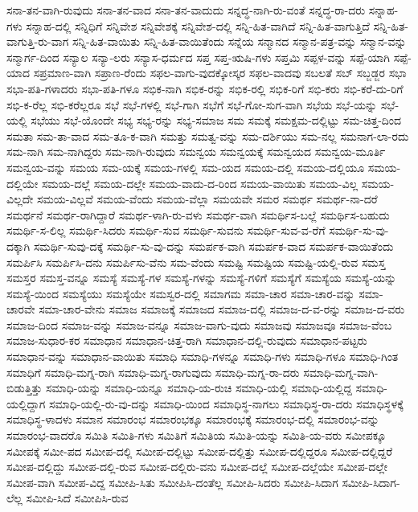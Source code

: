 {ಸನಾ-ತನ-ವಾಗಿ-ರುವುದು
ಸನಾ-ತನ-ವಾದ
ಸನಾ-ತನ-ವಾದುದು
ಸನ್ನದ್ಧ-ನಾಗಿ-ರು-ವಂತೆ
ಸನ್ನದ್ಧ-ರಾ-ದರು
ಸನ್ನಾಹ-ಗಳು
ಸನ್ನಾಹ-ದಲ್ಲಿ
ಸನ್ನಿಧಿಗೆ
ಸನ್ನಿವೇಶ
ಸನ್ನಿವೇಶಕ್ಕೆ
ಸನ್ನಿವೇಶ-ದಲ್ಲಿ
ಸನ್ನಿ-ಹಿತ-ವಾಗಿದೆ
ಸನ್ನಿ-ಹಿತ-ವಾಗುತ್ತಿದೆ
ಸನ್ನಿ-ಹಿತ-ವಾಗುತ್ತಿ-ರು-ವಾಗ
ಸನ್ನಿ-ಹಿತ-ವಾಯಿತು
ಸನ್ನಿ-ಹಿತ-ವಾಯಿತೆಂದು
ಸನ್ನೆಯ
ಸನ್ಮಾನದ
ಸನ್ಮಾನ-ಪತ್ರ-ವನ್ನು
ಸನ್ಮಾನ-ವನ್ನು
ಸನ್ಮಾರ್ಗ-ದಿಂದ
ಸನ್ಯಾಲ
ಸನ್ಯಾ-ಲರು
ಸನ್ಯಾಸ-ಧರ್ಮದ
ಸಪ್ತ
ಸಪ್ತ-ಋಷಿ-ಗಳು
ಸಪ್ತಮಿ
ಸಪ್ಪಳ-ವನ್ನು
ಸಪ್ಪೆ-ಯಾಗಿ
ಸಪ್ಪೆ-ಯಾದ
ಸಪ್ರಮಾಣ-ವಾಗಿ
ಸಪ್ರಾಣ-ರೆಂದು
ಸಫಲ-ವಾಗು-ವುದಕ್ಕೋಸ್ಕರ
ಸಫಲ-ವಾದವು
ಸಬಲತೆ
ಸಬ್
ಸಬ್ಜಡ್ಜರ
ಸಭಾ
ಸಭಾ-ಪತಿ-ಗಳಾದರು
ಸಭಾ-ಪತಿ-ಗಳೂ
ಸಭಿಕ-ನಾಗಿ
ಸಭಿಕ-ರನ್ನು
ಸಭಿಕ-ರಲ್ಲಿ
ಸಭಿಕ-ರಿಗೆ
ಸಭಿ-ಕರು
ಸಭಿ-ಕರೆ-ದು-ರಿಗೆ
ಸಭಿ-ಕ-ರೆಲ್ಲ
ಸಭಿ-ಕರೆಲ್ಲರೂ
ಸಭೆ
ಸಭೆ-ಗಳಲ್ಲಿ
ಸಭೆ-ಗಾಗಿ
ಸಭೆಗೆ
ಸಭೆ-ಗೋ-ಸುಗ-ವಾಗಿ
ಸಭೆಯ
ಸಭೆ-ಯನ್ನು
ಸಭೆ-ಯಲ್ಲಿ
ಸಭೆಯು
ಸಭೆ-ಯೊಂದೇ
ಸಭ್ಯ
ಸಭ್ಯ-ರನ್ನು
ಸಭ್ಯ-ಸಮಾಜ
ಸಮ
ಸಮಕ್ಕೆ
ಸಮಕ್ಷಮ-ದಲ್ಲಿಟ್ಟು
ಸಮ-ಚಿತ್ತ-ದಿಂದ
ಸಮತಾ
ಸಮ-ತಾ-ವಾದ
ಸಮ-ತೂ-ಕ-ವಾಗಿ
ಸಮತ್ತು
ಸಮತ್ವ-ವನ್ನು
ಸಮ-ದರ್ಶಿಯು
ಸಮ-ನಲ್ಲ
ಸಮನಾಗ-ಲಾ-ರದು
ಸಮ-ನಾಗಿ
ಸಮ-ನಾಗಿದ್ದರು
ಸಮ-ನಾಗಿ-ರುವುದು
ಸಮನ್ವಯ
ಸಮನ್ವಯಕ್ಕೆ
ಸಮನ್ವಯದ
ಸಮನ್ವಯ-ಮೂರ್ತಿ
ಸಮನ್ವಯ-ವನ್ನು
ಸಮಯ
ಸಮ-ಯಕ್ಕೆ
ಸಮಯ-ಗಳಲ್ಲಿ
ಸಮ-ಯದ
ಸಮಯ-ದಲ್ಲಿ
ಸಮಯ-ದಲ್ಲಿಯೂ
ಸಮಯ-ದಲ್ಲಿಯೇ
ಸಮಯ-ದಲ್ಲೆ
ಸಮಯ-ದಲ್ಲೇ
ಸಮಯ-ವಾದು-ದ-ರಿಂದ
ಸಮಯ-ವಾಯಿತು
ಸಮಯ-ವಿಲ್ಲ
ಸಮಯ-ವಿಲ್ಲದೇ
ಸಮಯ-ವಿಲ್ಲವೆ
ಸಮಯ-ವೆಂದು
ಸಮಯ-ವೆಲ್ಲಾ
ಸಮಯವೇ
ಸಮರ
ಸಮರ್ಥ
ಸಮರ್ಥ-ನಾ-ದರೆ
ಸಮರ್ಥನೆ
ಸಮರ್ಥ-ರಾಗಿದ್ದಾರೆ
ಸಮರ್ಥ-ಳಾಗಿ-ರು-ವಳು
ಸಮರ್ಥ-ವಾಗಿ
ಸಮರ್ಥಿಸ-ಬಲ್ಲೆ
ಸಮರ್ಥಿಸ-ಬಹುದು
ಸಮರ್ಥಿ-ಸ-ಲಿಲ್ಲ
ಸಮರ್ಥಿ-ಸಿದರು
ಸಮರ್ಥಿ-ಸುವ
ಸಮರ್ಥಿ-ಸುವನು
ಸಮರ್ಥಿ-ಸುವ-ವ-ರೆಗೆ
ಸಮರ್ಥಿ-ಸು-ವು-ದಕ್ಕಾಗಿ
ಸಮರ್ಥಿ-ಸುವು-ದಕ್ಕೆ
ಸಮರ್ಥಿ-ಸು-ವು-ದನ್ನು
ಸಮರ್ಪಕ-ವಾಗಿ
ಸಮರ್ಪಕ-ವಾದ
ಸಮರ್ಪಕ-ವಾಯಿತೆಂದು
ಸಮರ್ಪಿಸಿ
ಸಮರ್ಪಿಸಿ-ದನು
ಸಮರ್ಪಿಸು-ವೆನು
ಸಮ-ವೆಂದು
ಸಮಷ್ಟಿ
ಸಮಷ್ಟಿಯ
ಸಮಷ್ಟಿ-ಯಲ್ಲಿ-ರುವ
ಸಮಸ್ತ
ಸಮಸ್ತರ
ಸಮಸ್ತ-ವನ್ನೂ
ಸಮಸ್ಯೆ
ಸಮಸ್ಯೆ-ಗಳ
ಸಮಸ್ಯೆ-ಗಳನ್ನು
ಸಮಸ್ಯೆ-ಗಳಿಗೆ
ಸಮಸ್ಯೆಗೆ
ಸಮಸ್ಯೆಯ
ಸಮಸ್ಯೆ-ಯನ್ನು
ಸಮಸ್ಯೆ-ಯಿಂದ
ಸಮಸ್ಯೆಯು
ಸಮಸ್ಯೆಯೇ
ಸಮಸ್ವರ-ದಲ್ಲಿ
ಸಮಾಗಮ
ಸಮಾ-ಚಾರ
ಸಮಾ-ಚಾರ-ವನ್ನು
ಸಮಾ-ಚಾರವೇ
ಸಮಾ-ಚಾರ-ವೇನು
ಸಮಾಜ
ಸಮಾಜಕ್ಕೆ
ಸಮಾಜದ
ಸಮಾಜ-ದಲ್ಲಿ
ಸಮಾಜ-ದ-ವ-ರನ್ನು
ಸಮಾಜ-ದ-ವರು
ಸಮಾಜ-ದಿಂದ
ಸಮಾಜ-ವನ್ನು
ಸಮಾಜ-ವನ್ನೂ
ಸಮಾಜ-ವಾಗು-ವುದು
ಸಮಾಜವು
ಸಮಾಜವೂ
ಸಮಾಜ-ವೆಂಬ
ಸಮಾಜ-ಸುಧಾರ-ಕರ
ಸಮಾಧಾನ
ಸಮಾಧಾನ-ಚಿತ್ತ-ರಾಗಿ
ಸಮಾಧಾನ-ದಲ್ಲಿ-ರುವುದು
ಸಮಾಧಾನ-ಪಟ್ಟರು
ಸಮಾಧಾನ-ವನ್ನು
ಸಮಾಧಾನ-ವಾಯಿತು
ಸಮಾಧಿ
ಸಮಾಧಿ-ಗಳನ್ನೂ
ಸಮಾಧಿ-ಗಳು
ಸಮಾಧಿ-ಗಳೂ
ಸಮಾಧಿ-ಗಿಂತ
ಸಮಾಧಿಗೆ
ಸಮಾಧಿ-ಮಗ್ನ-ರಾಗಿ
ಸಮಾಧಿ-ಮಗ್ನ-ರಾಗುವುದು
ಸಮಾಧಿ-ಮಗ್ನ-ರಾ-ದರು
ಸಮಾಧಿ-ಮಗ್ನ-ವಾಗಿ-ಬಿಡುತ್ತಿತ್ತು
ಸಮಾಧಿ-ಯನ್ನು
ಸಮಾಧಿ-ಯನ್ನೂ
ಸಮಾಧಿ-ಯ-ರುಚಿ
ಸಮಾಧಿ-ಯಲ್ಲಿ
ಸಮಾಧಿ-ಯಲ್ಲಿದ್ದ
ಸಮಾಧಿ-ಯಲ್ಲಿದ್ದಾಗ
ಸಮಾಧಿ-ಯಲ್ಲಿ-ರು-ವು-ದನ್ನು
ಸಮಾಧಿ-ಯಿಂದ
ಸಮಾಧಿಸ್ಥ-ನಾಗಲು
ಸಮಾಧಿಸ್ಥ-ರಾ-ದರು
ಸಮಾಧಿಸ್ಥಳಕ್ಕೆ
ಸಮಾಧಿಸ್ಥ-ಳಾದಳು
ಸಮಾನ
ಸಮಾರಂಭ
ಸಮಾರಂಭಕ್ಕೂ
ಸಮಾರಂಭಕ್ಕೆ
ಸಮಾರಂಭ-ದಲ್ಲಿ
ಸಮಾರಂಭ-ವನ್ನು
ಸಮಾರಂಭ-ವಾದರೊ
ಸಮಿತಿ
ಸಮಿತಿ-ಗಳು
ಸಮಿತಿಗೆ
ಸಮಿತಿಯ
ಸಮಿತಿ-ಯನ್ನು
ಸಮಿತಿ-ಯ-ವರು
ಸಮೀಪಕ್ಕೂ
ಸಮೀಪಕ್ಕೆ
ಸಮೀ-ಪದ
ಸಮೀಪ-ದಲ್ಲಿ
ಸಮೀಪ-ದಲ್ಲಿಟ್ಟು
ಸಮೀಪ-ದಲ್ಲಿತ್ತು
ಸಮೀಪ-ದಲ್ಲಿದ್ದರೂ
ಸಮೀಪ-ದಲ್ಲಿದ್ದರೆ
ಸಮೀಪ-ದಲ್ಲಿದ್ದು
ಸಮೀಪ-ದಲ್ಲಿ-ರುವ
ಸಮೀಪ-ದಲ್ಲಿರು-ವನು
ಸಮೀಪ-ದಲ್ಲೆ
ಸಮೀಪ-ದಲ್ಲೆಯೇ
ಸಮೀಪ-ದಲ್ಲೇ
ಸಮೀಪ-ವಾಗಿ
ಸಮೀಪ-ವಿದ್ದ
ಸಮೀಪಿ-ಸಿತು
ಸಮೀಪಿಸಿ-ದಂತೆಲ್ಲ
ಸಮೀಪಿ-ಸಿದರು
ಸಮೀಪಿ-ಸಿದಾಗ
ಸಮೀಪಿ-ಸಿದಾಗ-ಲೆಲ್ಲ
ಸಮೀಪಿ-ಸಿದೆ
ಸಮೀಪಿಸಿ-ರುವ
}
